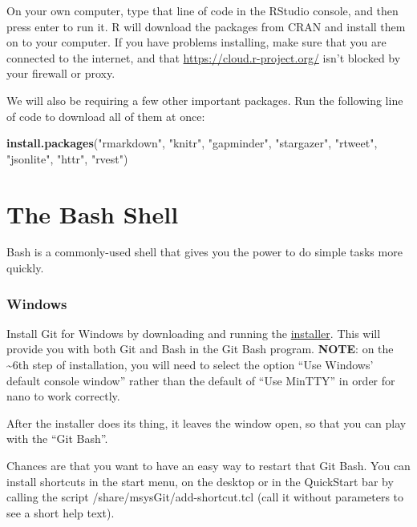 \documentclass[]{book}
\newenvironment{Shaded}{\begin{snugshade}}{\end{snugshade}}
\newcommand{\KeywordTok}[1]{\textcolor[rgb]{0.13,0.29,0.53}{\textbf{#1}}}
\newcommand{\StringTok}[1]{\textcolor[rgb]{0.31,0.60,0.02}{#1}}
\newcommand{\NormalTok}[1]{#1}
\begin{document}
On your own computer, type that line of code in the RStudio console, and
then press enter to run it. R will download the packages from CRAN and
install them on to your computer. If you have problems installing, make
sure that you are connected to the internet, and that
\url{https://cloud.r-project.org/} isn't blocked by your firewall or
proxy.

We will also be requiring a few other important packages. Run the
following line of code to download all of them at once:

\begin{Shaded}
\begin{Highlighting}[]
\KeywordTok{install.packages}\NormalTok{(}\StringTok{"rmarkdown"}\NormalTok{, }\StringTok{"knitr"}\NormalTok{, }\StringTok{"gapminder"}\NormalTok{, }\StringTok{"stargazer"}\NormalTok{, }\StringTok{"rtweet"}\NormalTok{, }\StringTok{"jsonlite"}\NormalTok{, }\StringTok{"httr"}\NormalTok{, }\StringTok{"rvest"}\NormalTok{)}
\end{Highlighting}
\end{Shaded}

\section{The Bash Shell}\label{the-bash-shell}

Bash is a commonly-used shell that gives you the power to do simple
tasks more quickly.

\subsubsection*{Windows}\label{windows}

Install Git for Windows by downloading and running the
\href{http://msysgit.github.io/}{installer}. This will provide you with
both Git and Bash in the Git Bash program. \textbf{NOTE}: on the
\textasciitilde{}6th step of installation, you will need to select the
option ``Use Windows' default console window'' rather than the default
of ``Use MinTTY'' in order for nano to work correctly.

After the installer does its thing, it leaves the window open, so that
you can play with the ``Git Bash''.

Chances are that you want to have an easy way to restart that Git Bash.
You can install shortcuts in the start menu, on the desktop or in the
QuickStart bar by calling the script /share/msysGit/add-shortcut.tcl
(call it without parameters to see a short help text).
\end{document}
